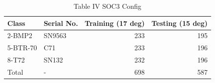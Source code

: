 \begin{table}
\caption{Table IV SOC3 Config}
\begin{tabular}{llrr}
\toprule
Class & Serial No. & Training (17 deg) & Testing (15 deg) \\
\midrule
2-BMP2 & SN9563 & 233 & 195 \\
5-BTR-70 & C71 & 233 & 196 \\
8-T72 & SN132 & 232 & 196 \\
Total & - & 698 & 587 \\
\bottomrule
\end{tabular}
\end{table}
